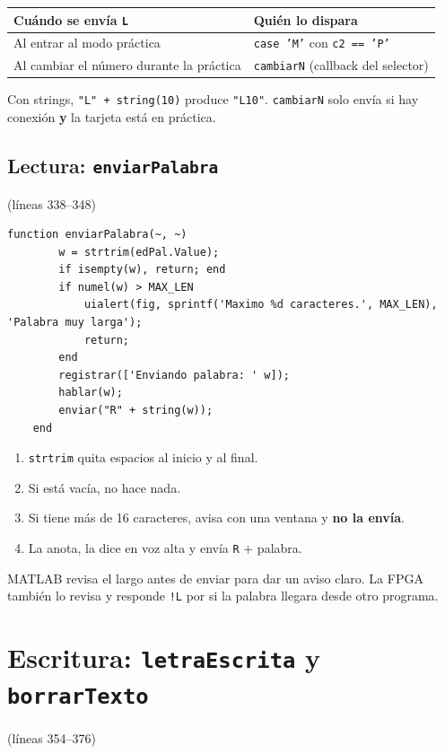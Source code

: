 \documentclass[11pt,a4paper]{article}
\newcommand{\linea}[1]{\textcolor{gris}{\small(líneas #1)}}
\newcommand{\cod}[1]{\texttt{#1}}
\begin{document}
\begin{center}
\begin{tabular}{>{\raggedright}p{6.5cm} >{\raggedright\arraybackslash}p{6.5cm}}
\toprule
\textbf{Cuándo se envía \cod{L}} & \textbf{Quién lo dispara} \\
\midrule
Al entrar al modo práctica & \cod{case 'M'} con \cod{c2 == 'P'} \\
Al cambiar el número durante la práctica & \cod{cambiarN} (callback del selector) \\
\bottomrule
\end{tabular}
\end{center}
Con strings, \cod{"L" + string(10)} produce \cod{"L10"}. \cod{cambiarN} solo envía
si hay conexión \textbf{y} la tarjeta está en práctica.

\subsection{Lectura: \texttt{enviarPalabra}}
\linea{338--348}
\begin{lstlisting}[firstnumber=338]
    function enviarPalabra(~, ~)
        w = strtrim(edPal.Value);
        if isempty(w), return; end
        if numel(w) > MAX_LEN
            uialert(fig, sprintf('Maximo %d caracteres.', MAX_LEN), 'Palabra muy larga');
            return;
        end
        registrar(['Enviando palabra: ' w]);
        hablar(w);
        enviar("R" + string(w));
    end
\end{lstlisting}
\begin{enumerate}
  \item \cod{strtrim} quita espacios al inicio y al final.
  \item Si está vacía, no hace nada.
  \item Si tiene más de 16 caracteres, avisa con una ventana y \textbf{no la envía}.
  \item La anota, la dice en voz alta y envía \cod{R} + palabra.
\end{enumerate}
\begin{idea}
MATLAB revisa el largo antes de enviar para dar un aviso claro. La FPGA también lo
revisa y responde \cod{!L} por si la palabra llegara desde otro programa.
\end{idea}

\section{Escritura: \texttt{letraEscrita} y \texttt{borrarTexto}}\label{sec:escritura}
\linea{354--376}
\end{document}
